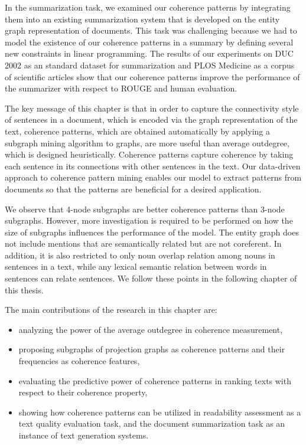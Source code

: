 In the summarization task, we examined our coherence patterns by integrating them into an existing summarization system that is developed on the entity graph representation of documents. 
This task was challenging  because we had to model the existence of our coherence patterns in a summary by defining several new constraints in linear programming.  
The results of our experiments on DUC 2002 as an standard dataset for summarization and PLOS Medicine as a corpus of scientific articles show that our coherence patterns improve the performance of the summarizer with respect to ROUGE and human evaluation. 


The key message of this chapter is that in order to capture the connectivity style of sentences in  a document, which is encoded via the graph representation of the text, coherence patterns, which are obtained automatically by applying a subgraph mining algorithm to graphs, are more useful than average outdegree, which is designed heuristically. 
Coherence patterns capture coherence by taking each sentence in its connections with other sentences in the text. 
Our \mbox{data-driven} approach to coherence pattern mining enables our model to extract patterns from documents so that the patterns are beneficial for a desired application. 

We observe that 4-node subgraphs are better coherence patterns than 3-node subgraphs. 
However, more investigation is required to be performed on how the size of subgraphs influences the performance of the model. 
The entity graph does not include mentions that are semantically related but are not coreferent. 
In addition, it is also restricted to only noun overlap relation among nouns in sentences in a text, while any lexical semantic relation between words in sentences can relate sentences. 
We follow these points in the following chapter of this thesis. 

The main contributions of the research in this chapter are:

\begin{itemize}
\item analyzing the power of the average outdegree in coherence measurement,
\item proposing subgraphs of projection graphs as coherence patterns and their frequencies as coherence features,
\item evaluating the predictive power of coherence patterns in ranking texts with respect to their coherence property,
\item showing how coherence patterns can be utilized in readability assessment as a text quality evaluation task, and the document summarization task as an instance of text generation systems.   
\end{itemize}


